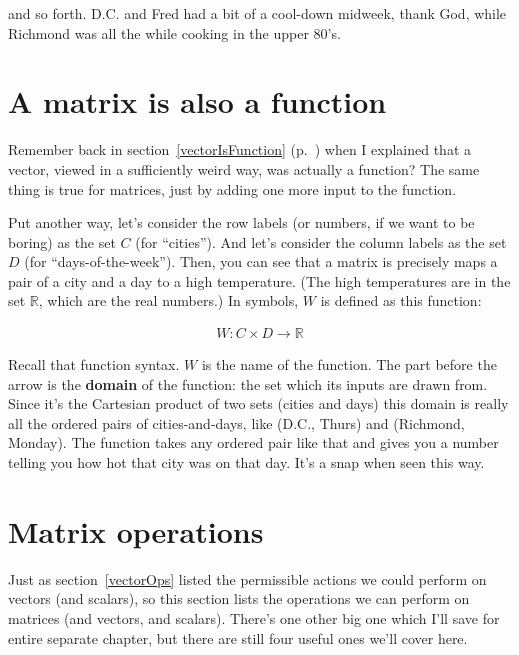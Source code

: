 and so forth. D.C. and Fred had a bit of a cool-down midweek, thank God, while
Richmond was all the while cooking in the upper 80's.

\section{A matrix is also a function}

Remember back in section~\ref{vectorIsFunction} (p.~\pageref{vectorIsFunction})
when I explained that a vector, viewed in a sufficiently weird way, was
actually a function? The same thing is true for matrices, just by adding one
more input to the function.

Put another way, let's consider the row labels (or numbers, if we want to be
boring) as the set $C$ (for ``cities''). And let's consider the column labels
as the set $D$ (for ``days-of-the-week''). Then, you can see that a matrix is
precisely maps a pair of a city and a day to a high temperature. (The high
temperatures are in the set $\mathbb{R}$, which are the real numbers.) In
symbols, $W$ is defined as this function:

\vspace{-.15in}
\begin{align*}
W : C \times D \rightarrow \mathbb{R}
\end{align*}
\vspace{-.15in}

Recall that function syntax. $W$ is the name of the function. The part before
the arrow is the \textbf{domain} of the function: the set which its inputs are
drawn from. Since it's the Cartesian product of two sets (cities and days) this
domain is really all the ordered pairs of cities-and-days, like (D.C., Thurs)
and (Richmond, Monday). The function takes any ordered pair like that and gives
you a number telling you how hot that city was on that day. It's a snap when
seen this way.


\section{Matrix operations}

Just as section~\ref{vectorOps} listed the permissible actions we could perform
on vectors (and scalars), so this section lists the operations we can perform
on matrices (and vectors, and scalars). There's one other big one which I'll
save for entire separate chapter, but there are still four useful ones we'll
cover here.

